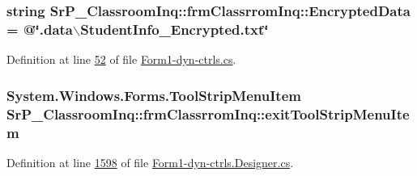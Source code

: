 \hypertarget{class_sr_p___classroom_inq_1_1frm_classrrom_inq_a3128c84ccd476a8a2e02bedab0ecc031}{
\subsubsection[{\-Encrypted\-Data}]{\setlength{\rightskip}{0pt plus 5cm}string {\bf \-Sr\-P\-\_\-\-Classroom\-Inq\-::frm\-Classrrom\-Inq\-::\-Encrypted\-Data} = @\char`\"{}.data$\backslash$\-Student\-Info\-\_\-\-Encrypted.\-txt\char`\"{}}}
\label{class_sr_p___classroom_inq_1_1frm_classrrom_inq_a3128c84ccd476a8a2e02bedab0ecc031}


\-Definition at line \hyperlink{_form1-dyn-ctrls_8cs_source_l00052}{52} of file \hyperlink{_form1-dyn-ctrls_8cs_source}{\-Form1-\/dyn-\/ctrls.\-cs}.

\hypertarget{class_sr_p___classroom_inq_1_1frm_classrrom_inq_a676112a698472361a000699f774d38ca}{
\subsubsection[{exit\-Tool\-Strip\-Menu\-Item}]{\setlength{\rightskip}{0pt plus 5cm}\-System.\-Windows.\-Forms.\-Tool\-Strip\-Menu\-Item {\bf \-Sr\-P\-\_\-\-Classroom\-Inq\-::frm\-Classrrom\-Inq\-::exit\-Tool\-Strip\-Menu\-Item}}}
\label{class_sr_p___classroom_inq_1_1frm_classrrom_inq_a676112a698472361a000699f774d38ca}


\-Definition at line \hyperlink{_form1-dyn-ctrls_8_designer_8cs_source_l01598}{1598} of file \hyperlink{_form1-dyn-ctrls_8_designer_8cs_source}{\-Form1-\/dyn-\/ctrls.\-Designer.\-cs}.

